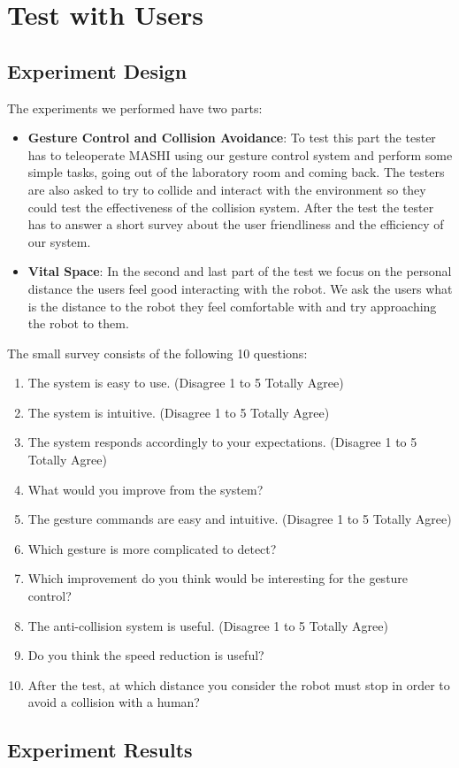 \section{Test with Users}
\label{sec:test}

\subsection{Experiment Design}
The experiments we performed have two parts:\\

\begin{itemize}
	\item \textbf{Gesture Control and Collision Avoidance}: To test this part the tester has to teleoperate MASHI using our gesture control system and perform some simple tasks, going out of the laboratory room and coming back. The testers are also asked to try to collide and interact with the environment so they could test the effectiveness of the collision system. After the test the tester has to answer a short survey about the user friendliness and the efficiency of our system.
	
	\item \textbf{Vital Space}: In the second and last part of the test we focus on the personal distance the users feel good interacting with the robot. We ask the users what is the distance to the robot they feel comfortable with and try approaching the robot to them.
\end{itemize}

The small survey consists of the following 10 questions:

\begin{enumerate}
	\item The system is easy to use. (Disagree 1 to 5 Totally Agree)
	\item The system is intuitive. (Disagree 1 to 5 Totally Agree)
	\item The system responds accordingly to your expectations. (Disagree 1 to 5 Totally Agree)
	\item What would you improve from the system?
	\item The gesture commands are easy and intuitive. (Disagree 1 to 5 Totally Agree)
	\item Which gesture is more complicated to detect?
	\item Which improvement do you think would be interesting for the gesture control?
	\item The anti-collision system is useful. (Disagree 1 to 5 Totally Agree)
	\item Do you think the speed reduction is useful?
	\item After the test, at which distance you consider the robot must stop in order to avoid a collision with a human?
\end{enumerate}





\subsection{Experiment Results}